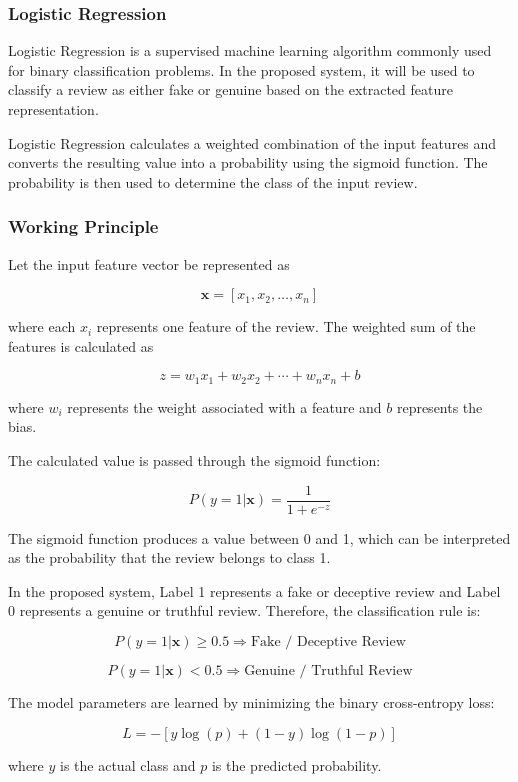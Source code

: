 \documentclass[12pt,a4paper]{report}
\begin{document}
\subsubsection*{Logistic Regression}

Logistic Regression is a supervised machine learning algorithm commonly used for binary classification problems. In the proposed system, it will be used to classify a review as either fake or genuine based on the extracted feature representation.

Logistic Regression calculates a weighted combination of the input features and converts the resulting value into a probability using the sigmoid function. The probability is then used to determine the class of the input review.

\subsubsection*{Working Principle}

Let the input feature vector be represented as

\[
\mathbf{x} = [x_1,x_2,\ldots,x_n]
\]

where each \(x_i\) represents one feature of the review. The weighted sum of the features is calculated as

\[
z = w_1x_1 + w_2x_2 + \cdots + w_nx_n + b
\]

where \(w_i\) represents the weight associated with a feature and \(b\) represents the bias.

The calculated value is passed through the sigmoid function:

\[
P(y=1|\mathbf{x}) =
\frac{1}{1+e^{-z}}
\]

The sigmoid function produces a value between 0 and 1, which can be interpreted as the probability that the review belongs to class 1.

In the proposed system, Label 1 represents a fake or deceptive review and Label 0 represents a genuine or truthful review. Therefore, the classification rule is:

\[
P(y=1|\mathbf{x}) \geq 0.5
\Rightarrow \text{Fake / Deceptive Review}
\]

\[
P(y=1|\mathbf{x}) < 0.5
\Rightarrow \text{Genuine / Truthful Review}
\]

The model parameters are learned by minimizing the binary cross-entropy loss:

\[
L =
-\left[y\log(p)+(1-y)\log(1-p)\right]
\]

where \(y\) is the actual class and \(p\) is the predicted probability.
\end{document}
